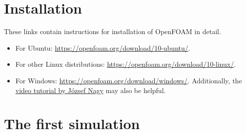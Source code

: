 \documentclass[10pt,a5paper]{article}
\newcommand{\openfoam}{\software{OpenFOAM}}
\newcommand{\software}[1]{\textsf{#1}}
\begin{document}
\section{Installation}
\label{sec:installation}
These links contain instructions for installation of \openfoam{} in detail.
\begin{itemize}
    \item For \software{Ubuntu}: \url{https://openfoam.org/download/10-ubuntu/}.
    \item For other \software{Linux} distributions: \url{https://openfoam.org/download/10-linux/}.
    \item For \software{Windows}: \url{https://openfoam.org/download/windows/}. Additionally, the \href{https://www.youtube.com/watch?v=w0bBOWlVlvA&list=PLcOe4WUSsMkEH4w-y5rSRtQ40ExbYmVWf&index=25}{video tutorial by J\'{o}zsef Nagy} may also be helpful.
\end{itemize}

\section{The first simulation}
\label{sec:first_simulation}
\end{document}
